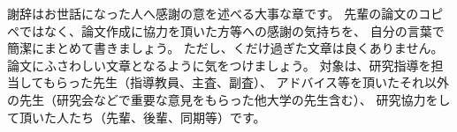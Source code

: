 \acknowledgment  %
謝辞はお世話になった人へ感謝の意を述べる大事な章です。
先輩の論文のコピペではなく、論文作成に協力を頂いた方等への感謝の気持ちを、
自分の言葉で簡潔にまとめて書きましょう。
ただし、くだけ過ぎた文章は良くありません。
論文にふさわしい文章となるように気をつけましょう。
対象は、研究指導を担当してもらった先生（指導教員、主査、副査）、
アドバイス等を頂いたそれ以外の先生（研究会などで重要な意見をもらった他大学の先生含む）、
研究協力をして頂いた人たち（先輩、後輩、同期等）です。
